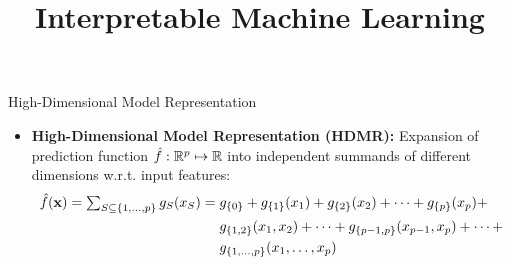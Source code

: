 \documentclass[11pt,compress,t,notes=noshow, aspectratio=169, xcolor=table]{beamer}
\title{Interpretable Machine Learning}
\date{}
\newcommand{\open}{\{}
\newcommand{\close}{\}}
\begin{document}
\newcommand{\titlefigure}{figure/open_blackbox}
\newcommand{\learninggoals}{
\item What are additive decomposition of prediction functions?
\item Why are they useful?
\item How do we obtain them?}

 
\begin{frame}{High-Dimensional Model Representation  
}

\begin{itemize}
\item \textbf{High-Dimensional Model Representation (HDMR):} Expansion of prediction function $\fh: \mathbb{R}^p \mapsto \mathbb{R}$ into independent summands of different dimensions w.r.t. input features:
\begin{equation*}
\begin{split}
\fh(\xv) =  %
\textstyle\sum_{S \subseteq \{1,\ldots,p\}} g_{S}(x_S) = \; & g_{\open 0 \close} + g_{\open 1 \close}(x_1) + g_{\open 2 \close}(x_2) + \dots + g_{\open p \close}(x_p) + \\
& g_{\open 1, 2 \close}(x_1, x_2) + \dots + g_{\open p-1, p \close}(x_{p-1}, x_p) + \dots + \\
& g_{\open 1,\ldots,p \close}(x_1, \ldots, x_p)
\end{split}
\end{equation*}
\vspace{-5pt}\pause

\end{itemize}
\end{frame}
\end{document}

